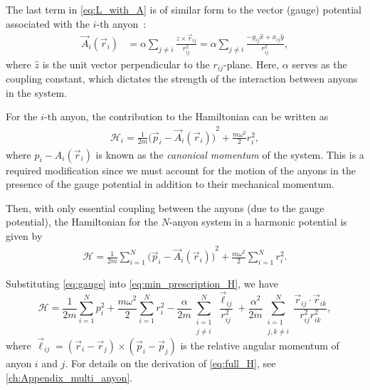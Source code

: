 
The last term in \cref{eq:L_with_A} is of similar form to the vector (gauge) potential associated with the $i$-th anyon~\cite{Khare2005,Date2003,Moriyasu1983}:
\begin{align}
    \vec{A}_i(\vec{r}_i) &= \alpha\sum_{j\neq i}\frac{\hat{z}\times \vec{r}_{ij}}{r_{ij}^2} = \alpha\sum_{j\neq i}\frac{-y_{ij}\hat{x} + x_{ij}\hat{y}}{r_{ij}^2}, \label{eq:gauge}
\end{align}
where $\hat{z}$ is the unit vector perpendicular to the $r_{ij}$-plane. Here, $\alpha$ serves as the coupling constant, which dictates the strength of the interaction between anyons in the system.


For the $i$-th anyon, the contribution to the Hamiltonian can be written as
\begin{align}
    \mathcal{H}_i = \frac{1}{2m}{\bigl(\vec{p}_i - \vec{A}_i(\vec{r}_i)\bigr)}^2 + \frac{m\omega^2}{2}{r}_i^{2},
\end{align}
where $p_i - A_i(\vec{r}_i)$ is known as the \textit{canonical momentum} of the system. This is a required modification since we must account for the motion of the anyons in the presence of the gauge potential in addition to their mechanical momentum.

Then, with only essential coupling between the anyons (due to the gauge potential), the Hamiltonian for the $N$-anyon system in a harmonic potential is given by
\begin{align}
    \mathcal{H} = \frac{1}{2m} \sum_{i=1}^{N}{\bigl(\vec{p}_i - \vec{A}_i(\vec{r}_i)\bigr)}^2 + \frac{m\omega^2}{2}\sum_{i=1}^{N}{r}_i^{2}. \label{eq:min_prescription_H}
\end{align}

Substituting \cref{eq:gauge} into \cref{eq:min_prescription_H}, we have
\begin{equation}
    \mathcal{H} = \frac{1}{2m}\sum_{i=1}^{N}{p}_i^{2} + \frac{m\omega^2}{2}\sum_{i=1}^{N}{r}_i^{2} - \frac{\alpha}{2m}\sum_{\substack{i=1\\j\neq i}}^{N}\frac{\vec{\ell}_{ij}}{r_{ij}^2} + \frac{\alpha^2}{2m}\sum_{\substack{i=1\\j,k\neq i}}^{N}\frac{\vec{r}_{ij}\cdot\vec{r}_{ik}}{r_{ij}^2r_{ik}^2},\label{eq:full_H}
\end{equation}
where $\vec{\ell}_{ij} = (\vec{r}_i-\vec{r}_j)\times(\vec{p}_i-\vec{p}_j)$ is the relative angular momentum of anyon $i$ and $j$. For details on the derivation of \cref{eq:full_H}, see \cref{ch:Appendix_multi_anyon}.

